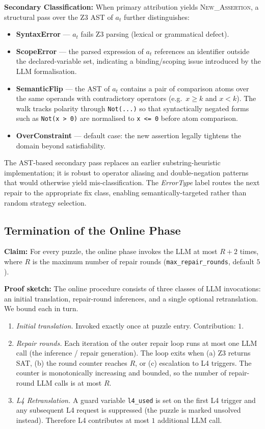 \textbf{Secondary Classification:}
When primary attribution yields \textsc{New\_Assertion}, a structural pass over the Z3 AST of $a_t$ further distinguishes:
\begin{itemize}
    \item \textbf{SyntaxError} — $a_t$ fails Z3 parsing (lexical or grammatical defect).
    \item \textbf{ScopeError} — the parsed expression of $a_t$ references an identifier outside the declared-variable set, indicating a binding/scoping issue introduced by the LLM formalisation.
    \item \textbf{SemanticFlip} — the AST of $a_t$ contains a pair of comparison atoms over the same operands with contradictory operators (e.g.\ $x \geq k$ and $x < k$). The walk tracks polarity through \texttt{Not(...)} so that syntactically negated forms such as \texttt{Not(x > 0)} are normalised to \texttt{x <= 0} before atom comparison.
    \item \textbf{OverConstraint} — default case: the new assertion legally tightens the domain beyond satisfiability.
\end{itemize}
The AST-based secondary pass replaces an earlier substring-heuristic implementation; it is robust to operator aliasing and double-negation patterns that would otherwise yield mis-classification.
The \textit{ErrorType} label routes the next repair to the appropriate fix class, enabling semantically-targeted rather than random strategy selection.

\subsection{Termination of the Online Phase}

\textbf{Claim:} For every puzzle, the online phase invokes the LLM at most $R + 2$ times, where $R$ is the maximum number of repair rounds (\texttt{max\_repair\_rounds}, default $5$).

\textbf{Proof sketch:} The online procedure consists of three classes of LLM invocations: an initial translation, repair-round inferences, and a single optional retranslation. We bound each in turn.

\begin{enumerate}
    \item \emph{Initial translation.} Invoked exactly once at puzzle entry. Contribution: $1$.
    \item \emph{Repair rounds.} Each iteration of the outer repair loop runs at most one LLM call (the inference / repair generation). The loop exits when (a) Z3 returns SAT, (b) the round counter reaches $R$, or (c) escalation to L4 triggers. The counter is monotonically increasing and bounded, so the number of repair-round LLM calls is at most $R$.
    \item \emph{L4 Retranslation.} A guard variable \texttt{l4\_used} is set on the first L4 trigger and any subsequent L4 request is suppressed (the puzzle is marked unsolved instead). Therefore L4 contributes at most $1$ additional LLM call.
\end{enumerate}

